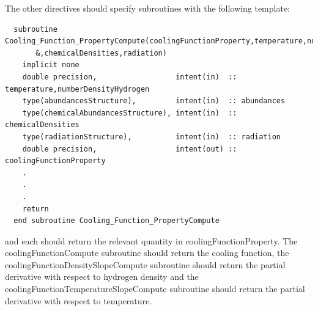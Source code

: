 The other directives should specify subroutines with the following template:
\begin{verbatim}
  subroutine Cooling_Function_PropertyCompute(coolingFunctionProperty,temperature,numberDensityHydrogen,abundances&
       &,chemicalDensities,radiation)
    implicit none
    double precision,                  intent(in)  :: temperature,numberDensityHydrogen
    type(abundancesStructure),         intent(in)  :: abundances
    type(chemicalAbundancesStructure), intent(in)  :: chemicalDensities
    type(radiationStructure),          intent(in)  :: radiation
    double precision,                  intent(out) :: coolingFunctionProperty
    .
    .
    .
    return
  end subroutine Cooling_Function_PropertyCompute
\end{verbatim}
and each should return the relevant quantity in {\normalfont \ttfamily coolingFunctionProperty}. The {\normalfont \ttfamily coolingFunctionCompute} subroutine should return the cooling function, the {\normalfont \ttfamily coolingFunctionDensitySlopeCompute} subroutine should return the partial derivative with respect to hydrogen density and the {\normalfont \ttfamily coolingFunctionTemperatureSlopeCompute} subroutine should return the partial derivative with respect to temperature.

